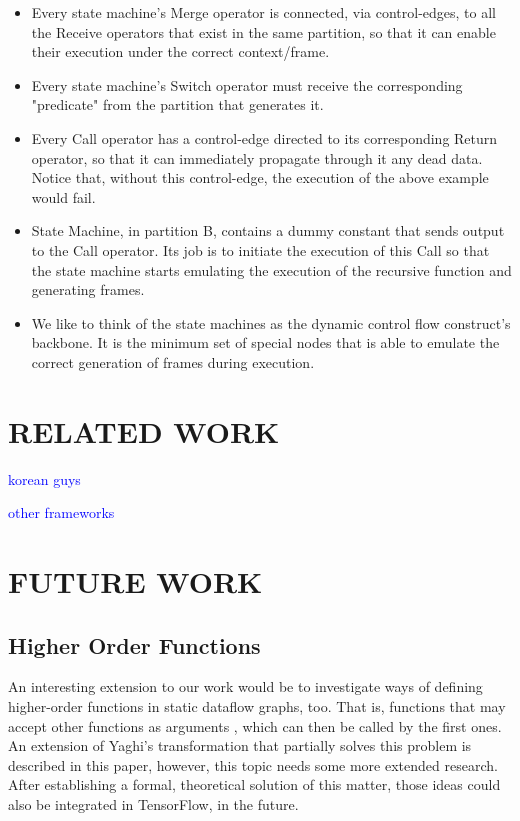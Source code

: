 \documentclass[ack,preface]{dithesis}
\begin{document}
\begin{itemize}
    \item Every state machine's Merge operator is connected, via control-edges, to all the Receive operators that exist in the same partition, so that it can enable their execution under the correct context/frame.
    \item Every state machine's Switch operator must receive the corresponding "predicate" from the partition that generates it.
    \item Every Call operator has a control-edge directed to its corresponding Return operator, so that it can immediately propagate through it any dead data. Notice that, without this control-edge, the execution of the above example would fail.
    \item State Machine, in partition B, contains a dummy constant that sends output to the Call operator. Its job is to initiate the execution of this Call so that the state machine starts emulating the execution of the recursive function and generating frames.
    \item We like to think of  the state machines as the dynamic control flow construct's backbone. It is the minimum set of special nodes that  is able to emulate the correct generation of frames during execution.
    \end{itemize}



\chapter{RELATED WORK}

 \textcolor{blue}{korean guys\cite{Jeong:2018}}

 \textcolor{blue}{other frameworks}

\chapter{FUTURE WORK}

   \section{Higher Order Functions}

An interesting extension to our work would be to investigate ways of defining higher-order functions in static dataflow graphs, too. That is, functions that may accept other functions as arguments , which can then be called by the first ones. An extension of Yaghi's transformation that partially solves this problem is described in this  \cite{RondogiannisW99} paper, however, this topic needs some more extended research. After establishing a formal, theoretical solution of this matter, those ideas could also be integrated in TensorFlow, in the future.
\end{document}
